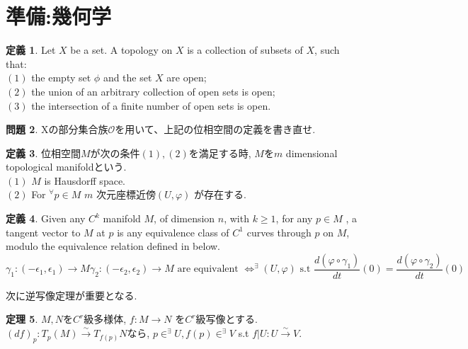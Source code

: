 \documentclass{jsarticle}
\theoremstyle{definition}
\newtheorem{theorem}{定理}
\newtheorem{definition}[theorem]{定義}
\newtheorem{problem}[theorem]{問題}
\begin{document}
\section{準備:幾何学}
\begin{definition}
Let $X$  be a set. A topology on $X$ is a collection of subsets of $X$, such that:\\
$(1)$ the empty set $\phi$ and the set $X$ are open;\\
$(2)$ the union of an arbitrary collection of open sets is open;\\
$(3)$ the intersection of a finite number of open sets is open.
\end{definition}
\begin{problem}
Xの部分集合族$\mathcal{O}$を用いて、上記の位相空間の定義を書き直せ.
\end{problem}
\begin{definition}
位相空間$M$が次の条件$(1), (2)$を満足する時, $M$を$m$ dimensional topological manifoldという.\\
$(1)$ $M$ is Hausdorff space.\\
$(2)$ For $^{\forall} p\in M$  $m$ 次元座標近傍$(U, \varphi)$ が存在する.
\end{definition}
\begin{definition}
Given any $C^k$ manifold $M$, of dimension $n$, with $k \geq 1$, for any $p\in M$ , a tangent vector to $M$ at $p$ is any equivalence class of $C^1$ curves through $p$ on $M$, modulo the equivalence relation defined in below.
\begin{equation}
\gamma_1:(-\epsilon _1, \epsilon_1 ) \rightarrow M  \gamma_2:(-\epsilon _2, \epsilon_2 ) \rightarrow M \text{ are equivalent } \Leftrightarrow ^\exists (U, \varphi ) \text{  s.t } \frac{d(\varphi \circ \gamma_1)}{dt} (0)=\frac{d(\varphi \circ \gamma_2)}{dt} (0)
\end{equation}
\end{definition}
次に逆写像定理が重要となる.
\begin{theorem}
$M,N$を$C^r$級多様体, $f:M\rightarrow N$ を$C^r$級写像とする.
$(df)_p:T_p(M)\overset{\sim}{\longrightarrow }T_{f(p)}N $なら, $p \in ^\exists U, f(p) \in ^\exists V $ s.t $f|U:U\overset{\sim}{\longrightarrow}V.$
\end{theorem}
\newpage
\end{document}
